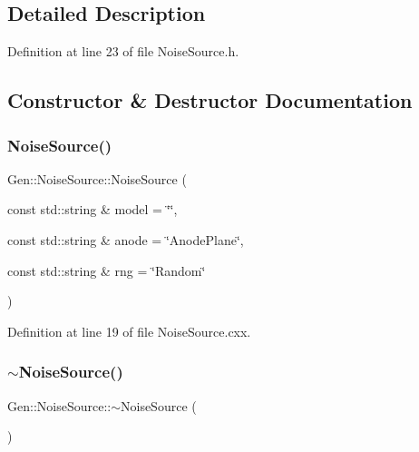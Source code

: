 \subsection{Detailed Description}


Definition at line 23 of file Noise\+Source.\+h.



\subsection{Constructor \& Destructor Documentation}
\mbox{\label{class_wire_cell_1_1_gen_1_1_noise_source_acad852532f7af1a4c8cb0cc7dde0bbf6}} 
\subsubsection{\texorpdfstring{Noise\+Source()}{NoiseSource()}}
{\footnotesize\ttfamily Gen\+::\+Noise\+Source\+::\+Noise\+Source (\begin{DoxyParamCaption}\item[{const std\+::string \&}]{model = {\ttfamily \char`\"{}\char`\"{}},  }\item[{const std\+::string \&}]{anode = {\ttfamily \char`\"{}AnodePlane\char`\"{}},  }\item[{const std\+::string \&}]{rng = {\ttfamily \char`\"{}Random\char`\"{}} }\end{DoxyParamCaption})}



Definition at line 19 of file Noise\+Source.\+cxx.

\mbox{\label{class_wire_cell_1_1_gen_1_1_noise_source_a1d6e7d7939d9321cc3b71e76044644a8}} 
\subsubsection{\texorpdfstring{$\sim$\+Noise\+Source()}{~NoiseSource()}}
{\footnotesize\ttfamily Gen\+::\+Noise\+Source\+::$\sim$\+Noise\+Source (\begin{DoxyParamCaption}{ }\end{DoxyParamCaption})\hspace{0.3cm}{\ttfamily [virtual]}}




